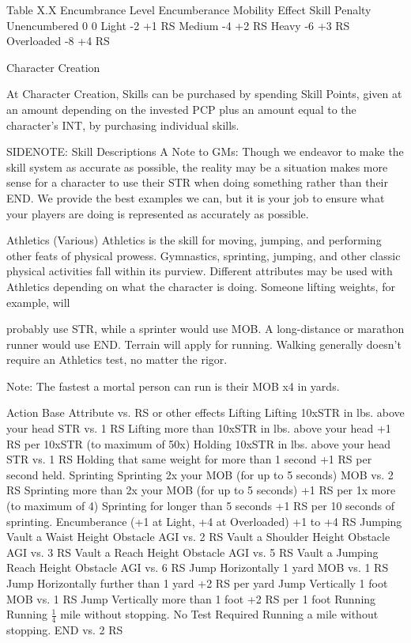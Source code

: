 \documentclass[oneside,11pt,english]{book}
\begin{document}
 

Table X.X Encumbrance Level 
Encumberance Mobility Effect Skill Penalty 
Unencumbered 0 0 
Light -2 +1 RS 
Medium -4 +2 RS 
Heavy -6 +3 RS 
Overloaded -8 +4 RS 

 

 

 

 

Character Creation 

 

At Character Creation, Skills can be purchased by spending Skill Points, given at an amount depending 
on the invested PCP plus an amount equal to the character’s INT, by purchasing individual skills. 

 

 

SIDENOTE: Skill Descriptions 
A Note to GMs: Though we endeavor to make the skill system as accurate as possible, the reality may be 
a situation makes more sense for a character to use their STR when doing something rather than their 
END. We provide the best examples we can, but it is your job to ensure what your players are doing is 
represented as accurately as possible. 

 

Athletics (Various) 
Athletics is the skill for moving, jumping, and performing other feats of physical prowess. Gymnastics, 
sprinting, jumping, and other classic physical activities fall within its purview. Different attributes may be 
used with Athletics depending on what the character is doing. Someone lifting weights, for example, will 


probably use STR, while a sprinter would use MOB. A long-distance or marathon runner would use 
END. Terrain will apply for running. Walking generally doesn’t require an Athletics test, no matter the 
rigor. 

 

Note: The fastest a mortal person can run is their MOB x4 in yards. 

 

 
Action Base Attribute vs. RS or other effects 
Lifting 
Lifting 10xSTR in lbs. above your head STR vs. 1 RS 
Lifting more than 10xSTR in lbs. above your head +1 RS per 10xSTR (to maximum of 50x) 
Holding 10xSTR in lbs. above your head STR vs. 1 RS 
Holding that same weight for more than 1 second +1 RS per second held. 
Sprinting 
Sprinting 2x your MOB (for up to 5 seconds) MOB vs. 2 RS 
Sprinting more than 2x your MOB (for up to 5 seconds) +1 RS per 1x more (to maximum of 4) 
Sprinting for longer than 5 seconds +1 RS per 10 seconds of sprinting. 
Encumberance (+1 at Light, +4 at Overloaded) +1 to +4 RS 
Jumping 
Vault a Waist Height Obstacle AGI vs. 2 RS 
Vault a Shoulder Height Obstacle AGI vs. 3 RS 
Vault a Reach Height Obstacle AGI vs. 5 RS 
Vault a Jumping Reach Height Obstacle AGI vs. 6 RS 
Jump Horizontally 1 yard MOB vs. 1 RS 
Jump Horizontally further than 1 yard +2 RS per yard 
Jump Vertically 1 foot MOB vs. 1 RS 
Jump Vertically more than 1 foot +2 RS per 1 foot 
Running 
Running $ \frac{1}{4} $ mile without stopping. No Test Required 
Running a mile without stopping. END vs. 2 RS 
\end{document}
